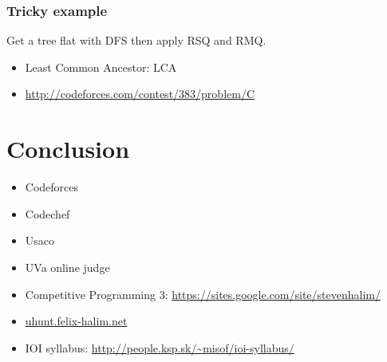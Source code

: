 \documentclass[10pt,svgnames,usenames,table]{beamer} %
\begin{document}
\begin{frame}
  \frametitle{Tricky example}
  Get a tree flat with DFS then apply RSQ and RMQ.
  \begin{itemize}
    \item Least Common Ancestor: LCA
    \item \url{http://codeforces.com/contest/383/problem/C}
  \end{itemize}
\end{frame}

\section{Conclusion}

\begin{frame}
  \begin{itemize}
    \item Codeforces
    \item Codechef
    \item Usaco
    \item UVa online judge
    \item Competitive Programming 3: \url{https://sites.google.com/site/stevenhalim/}
    \item \url{uhunt.felix-halim.net}
    \item IOI syllabus: \url{http://people.ksp.sk/~misof/ioi-syllabus/}
  \end{itemize}
\end{frame}
\end{document}
